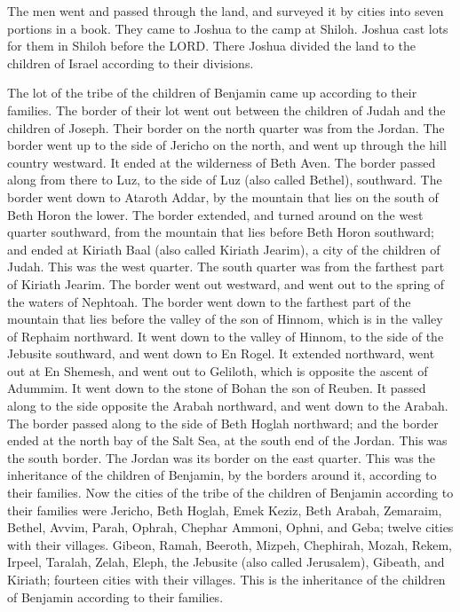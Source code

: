 The men went and passed through the land, and surveyed it
by cities into seven portions in a book. They came to Joshua to the camp
at Shiloh.  Joshua cast lots for them in Shiloh before
the LORD. There Joshua divided the land to the children of Israel
according to their divisions.

 The lot of the tribe of the children of Benjamin came up
according to their families. The border of their lot went out between
the children of Judah and the children of Joseph.  Their
border on the north quarter was from the Jordan. The border went up to
the side of Jericho on the north, and went up through the hill country
westward. It ended at the wilderness of Beth Aven.  The
border passed along from there to Luz, to the side of Luz (also called
Bethel), southward. The border went down to Ataroth Addar, by the
mountain that lies on the south of Beth Horon the lower. 
The border extended, and turned around on the west quarter southward,
from the mountain that lies before Beth Horon southward; and ended at
Kiriath Baal (also called Kiriath Jearim), a city of the children of
Judah. This was the west quarter.  The south quarter was
from the farthest part of Kiriath Jearim. The border went out westward,
and went out to the spring of the waters of Nephtoah. 
The border went down to the farthest part of the mountain that lies
before the valley of the son of Hinnom, which is in the valley of
Rephaim northward. It went down to the valley of Hinnom, to the side of
the Jebusite southward, and went down to En Rogel.  It
extended northward, went out at En Shemesh, and went out to Geliloth,
which is opposite the ascent of Adummim. It went down to the stone of
Bohan the son of Reuben.  It passed along to the side
opposite the Arabah northward, and went down to the Arabah.
 The border passed along to the side of Beth Hoglah
northward; and the border ended at the north bay of the Salt Sea, at the
south end of the Jordan. This was the south border.  The
Jordan was its border on the east quarter. This was the inheritance of
the children of Benjamin, by the borders around it, according to their
families.  Now the cities of the tribe of the children of
Benjamin according to their families were Jericho, Beth Hoglah, Emek
Keziz,  Beth Arabah, Zemaraim, Bethel, 
Avvim, Parah, Ophrah,  Chephar Ammoni, Ophni, and Geba;
twelve cities with their villages.  Gibeon, Ramah,
Beeroth,  Mizpeh, Chephirah, Mozah, 
Rekem, Irpeel, Taralah,  Zelah, Eleph, the Jebusite (also
called Jerusalem), Gibeath, and Kiriath; fourteen cities with their
villages. This is the inheritance of the children of Benjamin according
to their families.


